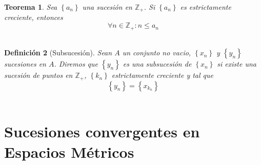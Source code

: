 \documentclass[oneside]{book} %
\theoremstyle{Teorema}
\newtheorem{Definicion}{Definición}[chapter]
\newtheorem{Teorema}[Definicion]{Teorema}
\theoremstyle{Ejemplos}
\theoremstyle{[Obs]}
\renewcommand{\{}{\left\lbrace} %
\renewcommand{\}}{\right\rbrace} %
\begin{document}
			\begin{Teorema}
				
				Sea $\{ a_n \}$ una sucesión en $\mathbb{Z}_{+}$. Si $\{ a_n \}$ es estrictamente creciente, entonces \\

				\[ \forall n \in \mathbb{Z}_{+} : n \leq a_n \] \\

			\end{Teorema}

			\begin{Definicion}[Subsucesión]

				Sean $A$ un conjunto no vacio, $\{ x_n \}$ y $\{ y_n \}$ sucesiones en $A$. Diremos que $\{ y_n \}$ es una subsucesión de $\{ x_n \}$ si existe una sucesión de puntos en $\mathbb{Z}_{+}$, $\{ k_n \}$ estrictamente creciente y tal que \\

				\[ \{ y_n \} = \{ x_{k_n} \} \] \\
				
			\end{Definicion}

		\section{Sucesiones convergentes en Espacios Métricos}
\end{document}
